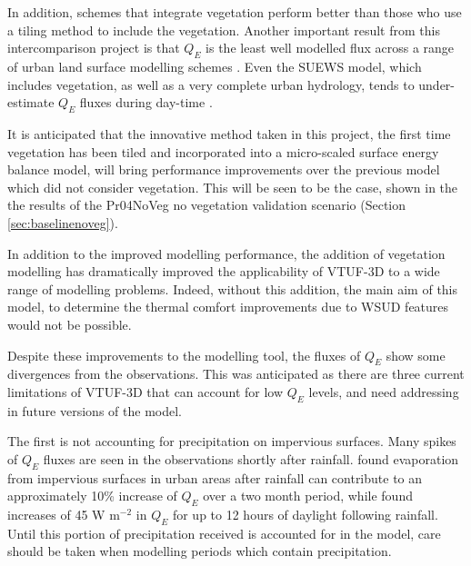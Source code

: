 \documentclass[final,3p,times,authoryear]{elsarticle}
\begin{document}
In addition, schemes that integrate vegetation perform better than those who use a tiling method to include the vegetation. Another important result from this intercomparison project is that $Q_{E}$ is the least well modelled flux across a range of urban land surface modelling schemes \citep{Grimmond2010}. Even the SUEWS model, which includes vegetation, as well as a very complete urban hydrology, tends to under-estimate $Q_{E}$ fluxes during day-time \citep{Jarvi2011}.

It is anticipated that the innovative method taken in this project, the first time vegetation has been tiled and incorporated into a micro-scaled surface energy balance model, will bring performance improvements over the previous model which did not consider vegetation. This will be seen to be the case, shown in the the results of the Pr04NoVeg no vegetation validation scenario (Section \ref{sec:baselinenoveg}). 

In addition to the improved modelling performance, the addition of vegetation modelling has dramatically improved the applicability of VTUF-3D to a wide range of modelling problems. Indeed, without this addition, the main aim of this model, to determine the thermal comfort improvements due to WSUD features would not be possible. 

Despite these improvements to the modelling tool, the fluxes of $Q_{E}$ show some divergences from the observations. This was anticipated as there are three current limitations of VTUF-3D that can account for low $Q_{E}$ levels, and need addressing in future versions of the model. 

The first is not accounting for precipitation on impervious surfaces. Many spikes of $Q_{E}$ fluxes are seen in the observations shortly after rainfall. \cite{Demuzere2014} found evaporation from impervious surfaces in urban areas after rainfall can contribute to an approximately 10\% increase of $Q_{E}$ over a two month period, while \cite{Wouters2013} found increases of 45 W m$^{-2}$ in $Q_{E}$ for up to 12 hours of daylight following rainfall. Until this portion of precipitation received is accounted for in the model, care should be taken when modelling periods which contain precipitation.

\end{document}
